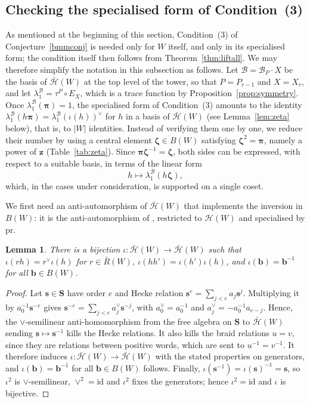 \documentclass[11pt, reqno]{amsart}
\newcommand{\cB}{\mathcal{B}}
\newcommand{\cH}{\mathcal{H}}
\numberwithin{equation}{section}
\newtheorem{lemma}[theorem]{Lemma}
\theoremstyle{remark}
\begin{document}
\subsection{Checking the specialised form of Condition~(3)}\label{subsec:cond3}
As mentioned at the beginning of this section, Condition~(3) of Conjecture~\ref{bmmconj} is needed only for $W$ itself, and only in its specialised form; the condition itself then follows from Theorem~\ref{thm:liftall}. We may therefore simplify the notation in this subsection as follows. Let $\cB=\cB_P\cdot X$ be the basis of $\bar{\cH}(W)$ at the top level of the tower, so that $P=P_{r-1}$ and $X=X_r$, and let $\lambda_1^{\cB}=\tau^P\circ E_X$, which is a trace function by Proposition~\ref{prop:symmetry}. Once $\lambda^{\mathcal B}_1(\boldsymbol\pi)=1$, the specialised form of Condition~(3) amounts to the identity $\lambda_1^{\cB}(h\boldsymbol\pi)=\lambda_1^{\cB}(\iota(h))^\vee$ for $h$ in a basis of $\bar{\cH}(W)$ (see Lemma~\ref{lem:zeta} below), that is, to $|W|$ identities. Instead of verifying them one by one, we reduce their number by using a central element $\boldsymbol\zeta\in B(W)$ satisfying $\boldsymbol\zeta^2=\boldsymbol\pi$, namely a power of $\mathbf z$ (Table~\ref{tab:zeta}). Since $\boldsymbol\pi\boldsymbol\zeta^{-1}=\boldsymbol\zeta$, both sides can be expressed, with respect to a suitable basis, in terms of the linear form
\[
h\longmapsto\lambda_1^{\cB}(h\boldsymbol\zeta),
\]
which, in the cases under consideration, is supported on a single coset.





We first need an anti-automorphism of $\bar{\cH}(W)$ that implements the inversion in $B(W)$: it is the anti-automorphism of \cite[Proposition~1.26]{BMM},
restricted to $\mathcal H(W)$ and specialised by $\mathrm{pr}$.

\begin{lemma}\label{lem:iota}
	There is a bijection $\iota\colon\bar{\cH}(W)\to\bar{\cH}(W)$ such that $\iota(rh)=r^\vee\iota(h)$ for $r\in \bar R(W)$, $\iota(hh')=\iota(h')\iota(h)$, and $\iota(\mathbf b)=\mathbf b^{-1}$ for all $\mathbf b\in B(W)$.
\end{lemma}
\begin{proof}
	Let $\mathbf s\in\mathbf S$ have order $e$ and Hecke relation $\mathbf s^e=\sum_{j<e}a_j\mathbf s^j$. Multiplying it by $a_0^{-1}\mathbf s^{-e}$ gives $\mathbf s^{-e}=\sum_{j<e}a_j^\vee\mathbf s^{-j}$, with $a_0^\vee=a_0^{-1}$ and $a_j^\vee=-a_0^{-1}a_{e-j}$. Hence, the $\vee$-semilinear anti-homomorphism from the free algebra on $\mathbf S$ to $\bar{\cH}(W)$ sending $\mathbf s\mapsto\mathbf s^{-1}$ kills the Hecke relations. It also kills the braid relations $u=v$, since they are relations between positive words, which are sent to $u^{-1}=v^{-1}$. It therefore induces $\iota\colon\bar{\cH}(W)\to\bar{\cH}(W)$ with the stated properties on generators, and $\iota(\mathbf b)=\mathbf b^{-1}$ for all $\mathbf b\in B(W)$ follows. Finally, $\iota(\mathbf s^{-1})=\iota(\mathbf s)^{-1}=\mathbf s$, so $\iota^2$ is $\vee$-semilinear, $\vee^2=\mathrm{id}$ and $\iota^2$ fixes the generators; hence $\iota^2=\mathrm{id}$ and $\iota$ is bijective.
\end{proof}
\end{document}
